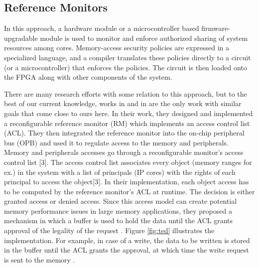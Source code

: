 \documentclass[sigconf]{acmart}
\theoremstyle{plain}
\theoremstyle{remark}
\begin{document}
\subsection{Reference Monitors}

In this approach, a hardware module or a microcontroller based firmware-upgradable module is used to monitor and enforce authorized sharing of system
resources among cores. Memory-access security policies are expressed in a specialized language, and a compiler translates these policies directly to a circuit (or a microcontroller) that enforces the policies. The circuit is then loaded onto the FPGA along with other components of the system.

There are many research efforts with some relation to this approach, but to the best of our current knowledge, works in \cite{HuffEmbedded} and in \cite{Huffmire} are the only work with similar goals that come close to ours here. In their work, they designed and implemented a reconfigurable reference monitor (RM) which implements an access control list (ACL). They then integrated the reference monitor into the on-chip peripheral bus (OPB) and used it to regulate access to the memory and peripherals. Memory and peripherals accesses go through a reconfigurable monitor's access control list [3]. The access control list associates every object (memory ranges for ex.) in the system with a list of principals (IP cores) with the rights of each principal to access the object[3]. In their implementation, each object access has to be computed by the reference monitor's ACL at runtime. The decision is either granted access or denied access. Since this access model can create potential memory performance issues in large memory applications, they proposed a mechanism in which a buffer is used to hold the data until the ACL grants approval of the legality of the request \cite{SPHuffmire}. Figure \ref{fig:ted} illustrates the implementation. For example, in case of a write, the data to be written is stored in the buffer until the ACL grants the approval, at which time the write request is sent to the memory \cite{SPHuffmire}.
\end{document}
